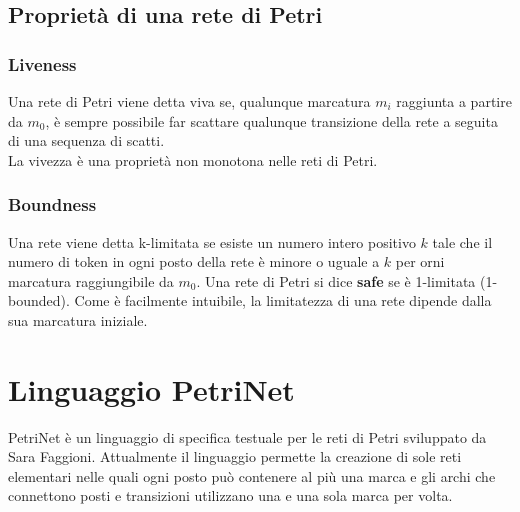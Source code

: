 \documentclass[italian,12pt]{book}
\begin{document}
\subsection{Proprietà di una rete di Petri}
\subsubsection{Liveness}
Una rete di Petri viene detta viva se, qualunque marcatura $m_i$
raggiunta a partire da $m_0$, è sempre possibile far scattare
qualunque transizione della rete a seguita di una sequenza di
scatti. \\
La vivezza è una proprietà non monotona nelle reti di Petri.

\subsubsection{Boundness}
Una rete viene detta k-limitata se esiste un numero intero positivo
$k$  tale che il numero di token in ogni posto della rete è minore o
uguale a $k$ per orni marcatura raggiungibile da $m_0$. Una rete di
Petri si dice {\bf safe} se è 1-limitata (1-bounded). Come è
facilmente intuibile, la limitatezza di una rete dipende dalla sua
marcatura iniziale.



\section{Linguaggio PetriNet}\label{sec:linguaggio_petrinet}
PetriNet è un linguaggio di specifica testuale per le reti di Petri
sviluppato da Sara Faggioni. Attualmente il linguaggio permette la
creazione di sole reti elementari nelle quali ogni posto può contenere
al più una marca e gli archi che connettono posti e transizioni
utilizzano una e una sola marca per volta.
% 
\end{document}
